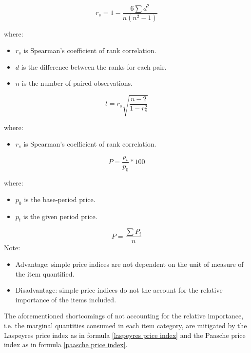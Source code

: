 \begin{equation}
\label{spearman coefficient}
r_s = 1 - \frac{6\sum d^2}{n(n^2 - 1)}
\end{equation}

where:
\begin{itemize}
 \item $r_s$ is Spearman's coefficient of rank correlation.
 \item $d$ is the difference between the ranks for each pair.
 \item $n$ is the number of paired observations.
\end{itemize}
\hformbar


\begin{equation}
\label{hypothesis rank correlation}
t = r_s\sqrt{\frac{n - 2}{1 - r_s^2}}
\end{equation}

where:
\begin{itemize}
 \item $r_s$ is Spearman's coefficient of rank correlation.
\end{itemize}
\hformbar


\begin{equation}
\label{simple index}
P = \frac{p_t}{p_0}*100
\end{equation}

where:
\begin{itemize}
 \item $p_0$ is the base-period price.
 \item $p_t$ is the given period price.
\end{itemize}
\hformbar


\begin{equation}
\label{simple average of the price relatives}
P = \frac{\sum P_i}{n}
\end{equation}
Note: 
\begin{itemize}
 \item Advantage: simple price indices are not dependent on the unit of measure of the item quantified.
 \item Disadvantage: simple price indices do not the account for the relative importance of the items included.
\end{itemize}
The aforementioned shortcomings of not accounting for the relative importance, i.e. the marginal quantities consumed in each item category, are mitigated by the Laspeyres price index as in formula \eqref{laspeyres price index} and the Paasche price index as in formula \eqref{paasche price index}.

